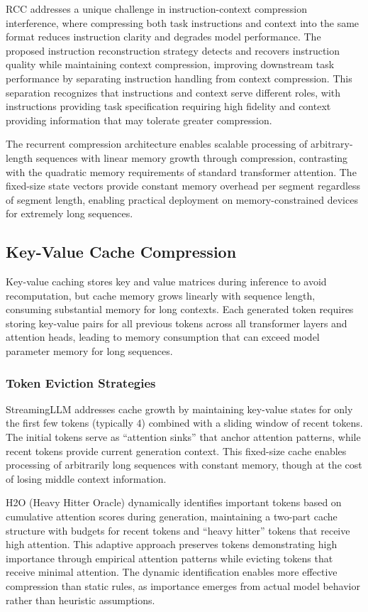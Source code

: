 RCC addresses a unique challenge in instruction-context compression interference, where compressing both task instructions and context into the same format reduces instruction clarity and degrades model performance. The proposed instruction reconstruction strategy detects and recovers instruction quality while maintaining context compression, improving downstream task performance by separating instruction handling from context compression. This separation recognizes that instructions and context serve different roles, with instructions providing task specification requiring high fidelity and context providing information that may tolerate greater compression.

The recurrent compression architecture enables scalable processing of arbitrary-length sequences with linear memory growth through compression, contrasting with the quadratic memory requirements of standard transformer attention. The fixed-size state vectors provide constant memory overhead per segment regardless of segment length, enabling practical deployment on memory-constrained devices for extremely long sequences.

\subsection{Key-Value Cache Compression}

Key-value caching stores key and value matrices during inference to avoid recomputation, but cache memory grows linearly with sequence length, consuming substantial memory for long contexts. Each generated token requires storing key-value pairs for all previous tokens across all transformer layers and attention heads, leading to memory consumption that can exceed model parameter memory for long sequences.

\subsubsection{Token Eviction Strategies}

StreamingLLM addresses cache growth by maintaining key-value states for only the first few tokens (typically 4) combined with a sliding window of recent tokens. The initial tokens serve as ``attention sinks'' that anchor attention patterns, while recent tokens provide current generation context. This fixed-size cache enables processing of arbitrarily long sequences with constant memory, though at the cost of losing middle context information.

H2O (Heavy Hitter Oracle) dynamically identifies important tokens based on cumulative attention scores during generation, maintaining a two-part cache structure with budgets for recent tokens and ``heavy hitter'' tokens that receive high attention. This adaptive approach preserves tokens demonstrating high importance through empirical attention patterns while evicting tokens that receive minimal attention. The dynamic identification enables more effective compression than static rules, as importance emerges from actual model behavior rather than heuristic assumptions.


